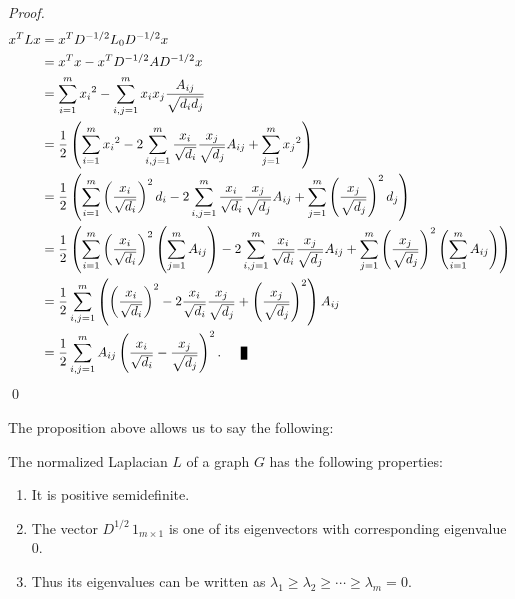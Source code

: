 \begin{proof}
   \begin{equation*} 
      \begin{split}
         x^TLx &= x^T D ^{-1/2} L_0 D^{-1/2} x \\
         &= x^Tx - x^TD^{-1/2}AD^{-1/2}x \\
         &= \sum_{i=1}^m {x_i}^2 - \sum_{i,j = 1}^m x_i  x_j \frac{A_{ij}}{\sqrt{d_i d_j}}  \\
         &= \frac{1}{2} \left( \sum_{i=1}^m {x_i}^2 - 2\sum_{i,j = 1}^m \frac{x_i}{\sqrt{d_i}} \frac{x_j}{\sqrt{d_j}} A_{ij} + \sum_{j=1}^m {x_j}^2 \right) \\
         &= \frac{1}{2} \left( \sum_{i=1}^m \left( \frac{x_i}{\sqrt{d_i}} \right) ^2 d_i - 2\sum_{i,j = 1}^m \frac{x_i}{\sqrt{d_i}} \frac{x_j}{\sqrt{d_j}} A_{ij} +  \sum_{j=1}^m \left( \frac{x_j}{\sqrt{d_j}} \right) ^2 d_j \right) \\
         &= \frac{1}{2} \left( \sum_{i=1}^m \left( \frac{x_i}{\sqrt{d_i}} \right) ^2 \left( \sum_{j=1}^m A_{ij} \right) - 2\sum_{i,j = 1}^m \frac{x_i}{\sqrt{d_i}} \frac{x_j}{\sqrt{d_j}} A_{ij} +  \sum_{j=1}^m \left( \frac{x_j}{\sqrt{d_j}} \right) ^2 \left( \sum_{i=1}^m A_{ij} \right) \right) \\
         &= \frac{1}{2} \sum_{i,j=1}^m \left( \left( \frac{x_i}{\sqrt{d_i}} \right)^2 - 2\frac{x_i}{\sqrt{d_i}}\frac{x_j}{\sqrt{d_j}} + \left( \frac{x_j}{\sqrt{d_j}} \right) ^2 \right) A_{ij} \\
         &= \frac{1}{2} \sum_{i,j=1}^m A_{ij} \left( \frac{x_i}{\sqrt{d_i}}- \frac{x_j}{\sqrt{d_j}} \right)^2. \qed
      \end{split}
   \end{equation*}\qed
\end{proof}

The proposition above allows us to say the following:

\begin{corollary}
   The normalized Laplacian $L$ of a graph $G$ has the following properties:
   \begin{enumerate}
      \item It is positive semidefinite.
      \item The vector $D^{1/2} \, 1_{m \times 1}$ is one of its eigenvectors with corresponding eigenvalue $0$.
      \item Thus its eigenvalues can be written as $\lambda_1 \ge \lambda_2 \ge \cdots \ge \lambda_m = 0$.
   \end{enumerate}
\end{corollary}

